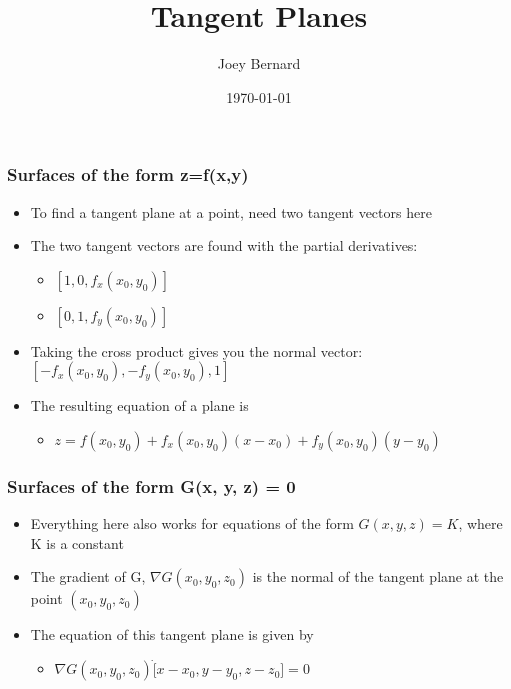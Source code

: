 \documentclass{beamer}
\title{Tangent Planes}
\author{Joey Bernard}
\institute{University of New Brunswick}
\date{\today}
\begin{document}
\begin{frame}
  \titlepage
\end{frame}

\begin{frame}
  \frametitle{Surfaces of the form z=f(x,y)}
  \begin{itemize}
  \item To find a tangent plane at a point, need two tangent vectors here
  \item The two tangent vectors are found with the partial derivatives:
    \begin{itemize}
    \item $[1, 0, f_x(x_0, y_0)]$
    \item $[0, 1, f_y(x_0, y_0)]$
    \end{itemize}
  \item Taking the cross product gives you the normal vector: $[-f_x(x_0, y_0), -f_y(x_0, y_0), 1]$
  \item The resulting equation of a plane is
    \begin{itemize}
    \item $z = f(x_0, y_0) + f_x(x_0, y_0)(x - x_0) + f_y(x_0, y_0)(y - y_0)$
    \end{itemize}
  \end{itemize}
\end{frame}

\begin{frame}
  \frametitle{Surfaces of the form G(x, y, z) = 0}
  \begin{itemize}
  \item Everything here also works for equations of the form $G(x, y, z) = K$, where K is a constant
  \item The gradient of G, $\nabla G(x_0, y_0, z_0)$ is the normal of the tangent plane at the point $(x_0, y_0, z_0)$
  \item The equation of this tangent plane is given by
    \begin{itemize}
    \item $\nabla G(x_0, y_0, z_0) \dot [x-x_0, y-y_0, z-z_0] = 0$
    \end{itemize}
  \end{itemize}
\end{frame}
\end{document}
